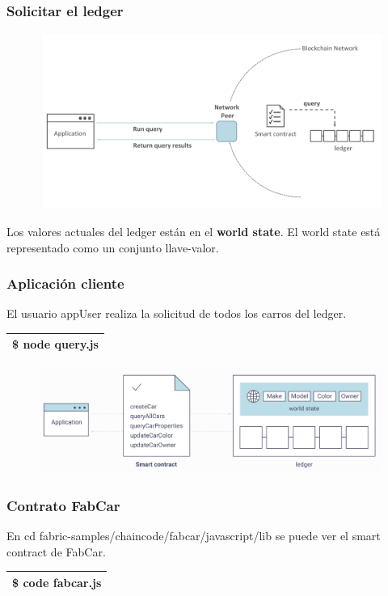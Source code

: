 \documentclass{beamer}
\begin{document}
	\begin{frame}
		\frametitle{Solicitar el ledger}
		\begin{figure}[h]
			\includegraphics[scale=.4]{app_02}
			\centering
		\end{figure}
		Los valores actuales del ledger están en el \textbf{world state}. El world state está representado como un conjunto llave-valor.
	\end{frame}
	
	\begin{frame}
		\frametitle{Aplicación cliente}
		El usuario appUser realiza la solicitud de todos los carros del ledger.
		\begin{center}
			\begin{tabulary}{\linewidth}{L}
				\hline
				\$ node query.js \\
				\hline
			\end{tabulary} 
		\end{center}
		\begin{figure}[h]
			\includegraphics[scale=.4]{app_03}
			\centering
		\end{figure}
	\end{frame}
	
	\begin{frame}
		\frametitle{Contrato FabCar}
		En cd fabric-samples/chaincode/fabcar/javascript/lib se puede ver el smart contract de FabCar.
		\begin{center}
			\begin{tabulary}{\linewidth}{L}
				\hline
				\$ code fabcar.js \\
				\hline
			\end{tabulary} 
		\end{center}
	\end{frame}
	
\end{document}
